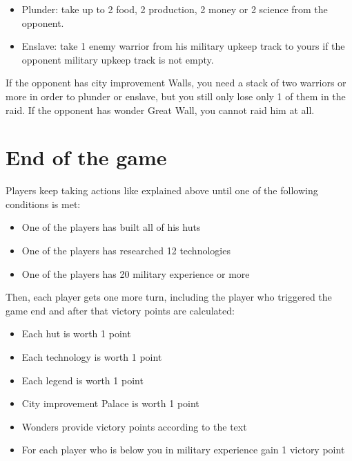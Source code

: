 \documentclass[11pt,a4paper,titlepage]{article}
\begin{document}
{{    \begin{itemize}
      \item Plunder: take up to 2 food, 2 production, 2 money or 2 science
        from the opponent.
      \item Enslave: take 1 enemy warrior from his military upkeep track to
        yours if the opponent military upkeep track is not empty.
    \end{itemize}

    \noindent
    If the opponent has city improvement Walls, you need a stack of two
    warriors or more in order to plunder or enslave, but you still only lose
    only 1 of them in the raid. If the opponent has wonder Great Wall, you
    cannot raid him at all.
  }\label{subsec:raid}
}\label{sec:combat}
\section{End of the game}{
  Players keep taking actions like explained above until one of the following
  conditions is met:
  \begin{itemize}
  \item One of the players has built all of his huts
  \item One of the players has researched 12 technologies
  \item One of the players has 20 military experience or more
  \end{itemize}

  \noindent
  Then, each player gets one more turn, including the player who triggered the
  game end and after that victory points are calculated:
  \begin{itemize}
  \item Each hut is worth 1 point
  \item Each technology is worth 1 point
  \item Each legend is worth 1 point
  \item City improvement Palace is worth 1 point
  \item Wonders provide victory points according to the text
  \item For each player who is below you in military experience gain 1 victory point
  \end{itemize}
}\label{sec:game_end}

\newpage
\end{document}
